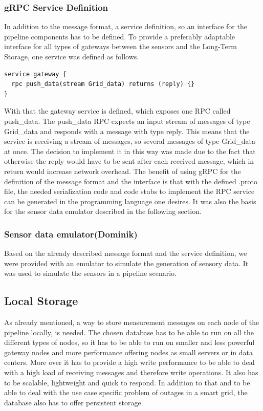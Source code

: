 \subsubsection{gRPC Service Definition}
In addition to the message format, a service definition, so an interface for the pipeline components has to be defined. To provide a preferably adaptable interface for all types of gateways between the sensors and the Long-Term Storage, one service was defined as follows.
\begin{lstlisting}
service gateway {
  rpc push_data(stream Grid_data) returns (reply) {}
}
\end{lstlisting}
With that the gateway service is defined, which exposes one RPC called push\_data. The push\_data RPC expects an input stream of messages of type Grid\_data and responds with a message with type reply. This means that the service is receiving a stream of messages, so several messages of type Grid\_data at once. The decision to implement it in this way was made due to the fact that otherwise the reply would have to be sent after each received message, which in return would increase network overhead. The benefit of using gRPC for the definition of the message format and the interface is that with the defined .proto file, the needed serialization code and code stubs to implement the RPC service can be generated in the programming language one desires. It was also the basis for the sensor data emulator described in the following section.

\subsubsection{Sensor data emulator(Dominik)}
Based on the already described message format and the service definition, we were provided with an emulator to simulate the generation of sensory data. It was used to simulate the sensors in a pipeline scenario.

\subsection{Local Storage}
As already mentioned, a way to store measurement messages on each node of the pipeline locally, is needed. The chosen database has to be able to run on all the different types of nodes, so it has to be able to run on smaller and less powerful gateway nodes and more performance offering nodes as small servers or in data centers. More over it has to provide a high write performance to be able to deal with a high load of receiving messages and therefore write operations. It also has to be scalable, lightweight and quick to respond. In addition to that and to be able to deal with the use case specific problem of outages in a smart grid, the database also has to offer persistent storage.  
